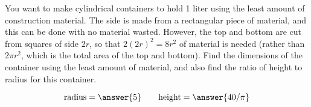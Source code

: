 \documentclass{ximera}
\author{Bart Snapp}
\begin{document}
\begin{exercise}


  You want to make cylindrical containers to hold 1 liter using the
  least amount of construction material.  The side is made from a
  rectangular piece of material, and this can be done with no material
  wasted.  However, the top and bottom are cut from squares of side
  $2r$, so that $2(2r)^2=8r^2$ of material is needed (rather than
  $2\pi r^2$, which is the total area of the top and bottom).  Find
  the dimensions of the container using the least amount of material,
  and also find the ratio of height to radius for this container.
  \begin{prompt}
  \[
  \text{radius}=\answer{5}\qquad\text{height}=\answer{40/\pi}
  \]
  \end{prompt}
\end{exercise}
\end{document}
